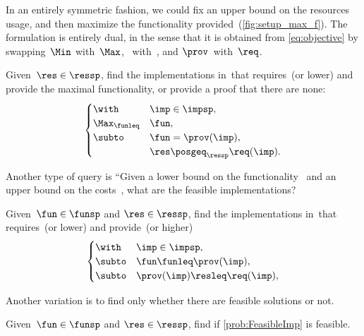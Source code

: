 In an entirely symmetric fashion, we could fix an upper bound on
the resources usage, and then maximize the functionality provided~(\cref{fig:setup_max_f}).
The formulation is entirely dual, in the sense that it is obtained
from \cref{eq:objective} by swapping~$\Min$ with~$\Max$, \funsp~with~\ressp,
and $\prov$~with~$\req$.

\begin{problem}[\FixResMinFun]
  \label{prob:FixResMinFun}
  Given~$\res\in\ressp$, find the implementations
  in~\impsp that requires~\res (or lower)
  and provide the maximal functionality, or provide a proof that there are none:
  \begin{equation}
    \begin{cases}
      \with & \imp\in\impsp,\\
      \Max_{\funleq} & \fun,\\
      \subto & \fun=\prov(\imp),\\
      & \res\posgeq_{\ressp}\req(\imp).
    \end{cases}\label{eq:objective-1}
  \end{equation}
\end{problem}


\vspace{1cm}


Another type of query is
``Given a lower bound on the functionality~\fun
and an upper bound on the costs~\fun, what are the feasible implementations?


\begin{problem}[\FeasibleImp]
  \label{prob:FeasibleImp}
  Given~$\fun\in\funsp$ and $\res\in\ressp$, find the implementations
  in~\impsp that requires~\res (or lower)
  and provide~\fun (or higher)
  \begin{equation}
    \begin{cases}
      \with & \imp\in\impsp,\\
      \subto & \fun \funleq \prov(\imp),\\
      \subto &  \prov(\imp) \resleq \req(\imp) ,\\
    \end{cases}
  \end{equation}
\end{problem}

Another variation is to find only whether there are feasible solutions or not.

\begin{problem}[\Feasibility]
  \label{prob:Feasibility}
  Given~$\fun\in\funsp$ and $\res\in\ressp$, find if \cref{prob:FeasibleImp} is feasible.
\end{problem}
